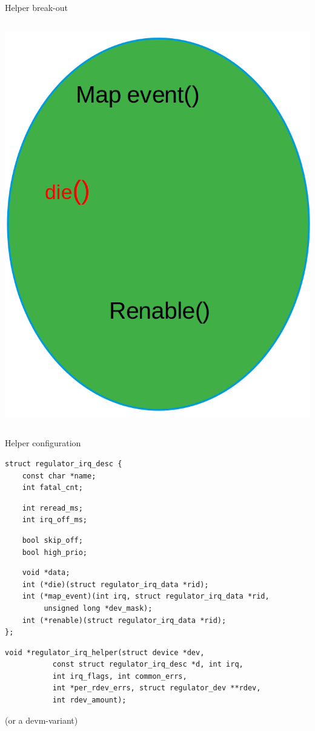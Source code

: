 \documentclass[10pt]{beamer}
\begin{document}
\begin{frame}[t]{Helper break-out}
\begin{columns}[onlytextwidth]
	\includegraphics[width=1\linewidth]{img/isr/driver_size.png}
	\end{columns}
\end{frame}



\begin{frame}[fragile]{Helper configuration}
\lstset{language=C}
\scriptsize

\begin{lstlisting}
struct regulator_irq_desc {
	const char *name;
	int fatal_cnt;
 \end{lstlisting}
\pause
\begin{lstlisting}
	int reread_ms;
	int irq_off_ms;
 \end{lstlisting}
\pause
\begin{lstlisting}
	bool skip_off;
	bool high_prio;
 \end{lstlisting}
\pause
\begin{lstlisting}
	void *data;
	int (*die)(struct regulator_irq_data *rid);
	int (*map_event)(int irq, struct regulator_irq_data *rid,
	     unsigned long *dev_mask);
	int (*renable)(struct regulator_irq_data *rid);
};
 \end{lstlisting}
\pause

\begin{lstlisting}
void *regulator_irq_helper(struct device *dev,
		   const struct regulator_irq_desc *d, int irq,
		   int irq_flags, int common_errs, 
		   int *per_rdev_errs, struct regulator_dev **rdev,
		   int rdev_amount);
\end{lstlisting}
(or a devm-variant)
\end{frame}
\end{document}
